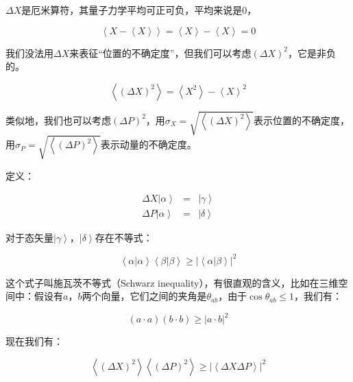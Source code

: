 $\Delta X$是厄米算符，其量子力学平均可正可负，平均来说是0，

\begin{equation*}
\left\langle X -  \left\langle X \right\rangle \right\rangle = \left\langle X \right\rangle - \left\langle X \right\rangle = 0
\end{equation*}

我们没法用$\Delta X$来表征“位置的不确定度”，但我们可以考虑$\left( \Delta X  \right)^2 $，它是非负的。

\begin{equation}
\left\langle  \left( \Delta X  \right)^2  \right\rangle = \left\langle X^2 \right\rangle - \left\langle X \right\rangle^2
\end{equation}

类似地，我们也可以考虑$\left( \Delta P \right)^2 $，用$\sigma_X = \sqrt{ \left\langle  \left( \Delta X  \right)^2  \right\rangle  }$表示位置的不确定度，用$\sigma_P = \sqrt{ \left\langle  \left( \Delta P  \right)^2  \right\rangle  }$表示动量的不确定度。

定义：

\begin{eqnarray*}
\Delta X \left| \alpha \right\rangle &=& \left| \gamma \right\rangle \\
\Delta P \left| \alpha \right\rangle &=& \left| \delta \right\rangle
\end{eqnarray*}

对于态矢量$\left| \gamma \right\rangle$，$\left| \delta \right\rangle$存在不等式：

\begin{equation}
\left\langle \alpha | \alpha \right\rangle \left\langle \beta | \beta \right\rangle \ge \left| \left\langle \alpha | \beta \right\rangle \right|^2
\end{equation}

这个式子叫施瓦茨不等式（Schwarz inequality），有很直观的含义，比如在三维空间中：假设有$a$，$b$两个向量，它们之间的夹角是$\theta_{ab}$，由于$\cos \theta_{ab} \le 1$，我们有：

\begin{equation}
\left( a \cdot a \right) \left( b \cdot b \right) \ge \left| a \cdot b  \right|^2
\end{equation}

现在我们有：

\begin{equation*}
\left\langle \left( \Delta X \right)^2  \right\rangle \left\langle \left( \Delta P \right)^2  \right\rangle \ge \left|  \left\langle \Delta X \Delta P \right\rangle  \right|^2
\end{equation*}

